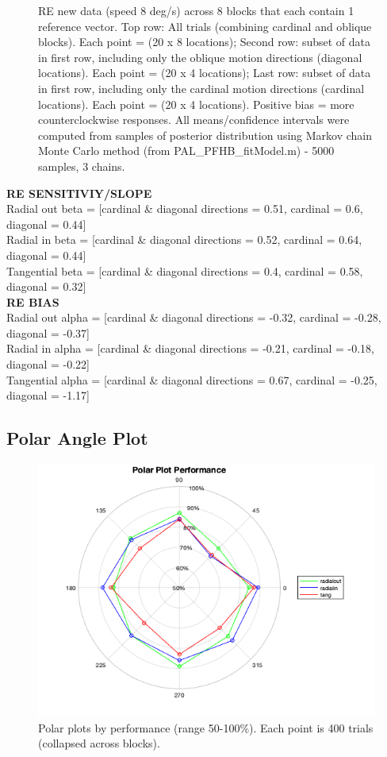\documentclass[11pt]{article} %
\begin{document}
\begin{figure}[H]
\caption{RE new data (speed 8 deg/s) across 8 blocks that each contain 1 reference vector. Top row: All trials (combining cardinal and oblique blocks). Each point = (20 x 8 locations); Second row: subset of data in first row, including only the oblique motion directions (diagonal locations). Each point = (20 x 4 locations); Last row: subset of data in first row, including only the cardinal motion directions (cardinal locations). Each point = (20 x 4 locations). Positive bias = more counterclockwise responses. All means/confidence intervals were computed from samples of posterior distribution using Markov chain Monte Carlo method (from PAL\_PFHB\_fitModel.m) - 5000 samples, 3 chains.}
\end{figure}

\textbf{RE SENSITIVIY/SLOPE}
\\
Radial out beta = [cardinal \& diagonal directions =  0.51, cardinal = 0.6, diagonal = 0.44]
\\
Radial in beta = [cardinal \& diagonal directions =  0.52, cardinal = 0.64, diagonal = 0.44]
\\
Tangential beta = [cardinal \& diagonal directions =  0.4, cardinal = 0.58, diagonal = 0.32]
\\
\textbf{RE BIAS}
\\
Radial out alpha = [cardinal \& diagonal directions =  -0.32, cardinal = -0.28, diagonal = -0.37]
\\
Radial in alpha = [cardinal \& diagonal directions =  -0.21, cardinal = -0.18, diagonal = -0.22]
\\
Tangential alpha = [cardinal \& diagonal directions =  0.67, cardinal = -0.25, diagonal = -1.17]

\newpage
\subsection{Polar Angle Plot}
\begin{figure}[H]
\centering %
\includegraphics[scale=.5]{Images/performance_polarplot.png}
\caption{Polar plots by performance (range 50-100\%). Each point is 400 trials (collapsed across blocks).}
\end{figure}
\end{document}

